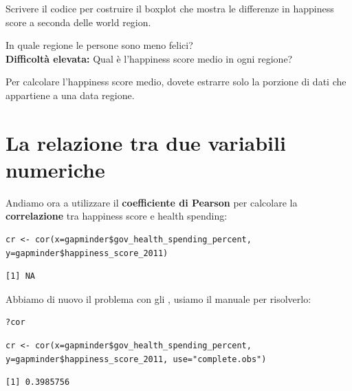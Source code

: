 \vspace{0.5cm} 

\begin{exercise}\label{ex4.5}
	
\noindent Scrivere il codice per costruire il boxplot che mostra le differenze in happiness score a seconda delle world region.

\noindent In quale regione le persone sono meno felici? \\

\noindent \textbf{Difficolt\`a elevata:} Qual \`e l'happiness score medio in ogni regione? 


	\begin{myitemize}
		\item Per calcolare l'happiness score medio, dovete estrarre solo la porzione di dati che appartiene a una data regione.
	\end{myitemize}

\end{exercise}


\section{La relazione tra due variabili numeriche}

Andiamo ora a utilizzare il \textbf{coefficiente di Pearson} per calcolare la \textbf{correlazione} tra happiness score e health spending:

\begin{lstlisting}[style=Rstylescript]
cr <- cor(x=gapminder$gov_health_spending_percent, y=gapminder$happiness_score_2011)
\end{lstlisting}

\begin{lstlisting}[style=Rstyle]
[1] NA
\end{lstlisting}
%
Abbiamo di nuovo il problema con gli , usiamo il manuale per risolverlo:

\begin{lstlisting}[style=Rstyle]
?cor
\end{lstlisting}

\begin{lstlisting}[style=Rstylescript]
cr <- cor(x=gapminder$gov_health_spending_percent, y=gapminder$happiness_score_2011, use="complete.obs")
\end{lstlisting}

\begin{lstlisting}[style=Rstyle]
[1] 0.3985756
\end{lstlisting}

